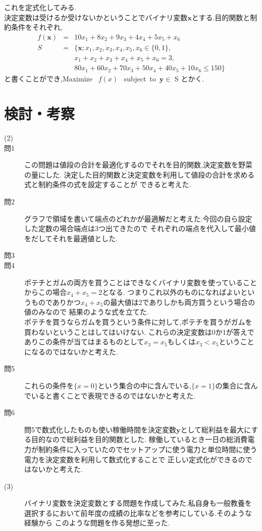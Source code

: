 \documentclass[12pt]{jarticle}
\begin{document}
\begin{description}
\begin{table}[h]
\begin{center}
		      \end{center}
	      \end{table}
	      これを定式化してみる.\\
	      決定変数は受けるか受けないかということでバイナリ変数$\boldsymbol{x}$とする.目的関数と制約条件をそれぞれ,
	      \begin{eqnarray}
		      f(\boldsymbol{x})&=&10x_1+8x_2+9x_3+4x_4+5x_5+x_6\nonumber\\
		      S&=&\{\boldsymbol{x};x_1,x_2,x_3,x_4,x_5,x_6\in \{0,1\},\nonumber\\
		      &&x_1+x_2+x_3+x_4+x_5+x_6=3,\nonumber\\
		      &&80x_1+60x_2+70x_3+50x_4+40x_5+10x_6\leq 150\}\nonumber
	      \end{eqnarray}
	      と書くことができ,Maximize \ $f(x)$ \ subject\ to\ $\boldsymbol{y}\in$ S とかく.       
\end{description}
\section{検討・考察}
\begin{description}
	\item[(2)]
	\item[問1] この問題は値段の合計を最適化するのでそれを目的関数,決定変数を野菜の量にした.
	      決定した目的関数と決定変数を利用して値段の合計を求める式と制約条件の式を設定することが
	      できると考えた.
	\item[問2]
	      グラフで領域を書いて端点のどれかが最適解だと考えた.今回の自ら設定した定数の場合端点は3つ出てきたので
	      それぞれの端点を代入して最小値をだしてそれを最適値とした. 
	\item[問3]
	      
	\item[問4]
	      ポテチとガムの両方を買うことはできなくバイナリ変数を使っていることからこの場合$x_4+x_5=2$となる.
	      つまりこれ以外のものになればよいというものでありかつ$x_4+x_5$の最大値は2でありしかも両方買うという場合の値のみなので
	      結果のような式を立てた.\\
	      ポテチを買うならガムを買うという条件に対して,ポテチを買うがガムを買わないということはしてはいけない.
	      これらの決定変数は0か1が答えでありこの条件が当てはまるものとして$x_3=x_5$もしくは$x_3<x_5$ということになるのではないかと考えた.   
	\item[問5]
	      これらの条件を$\{x=0\}$という集合の中に含んでいる,$\{x=1\}$の集合に含んでいると書くことで表現できるのではないかと考えた.   
	\item[問6]
	      問5で数式化したものも使い稼働時間を決定変数$\boldsymbol{y}$として総利益を最大にする目的なので総利益を目的関数とした.
	      稼働しているとき一日の総消費電力が制約条件に入っていたのでセットアップに使う電力と単位時間に使う電力を決定変数を利用して数式化することで
	      正しい定式化ができるのではないかと考えた. 
	\item[(3)]
	      バイナリ変数を決定変数とする問題を作成してみた.私自身も一般教養を選択するにおいて前年度の成績の比率などを参考にしている.そのような経験から
	      このような問題を作る発想に至った.  
\end{description}
\end{document}
